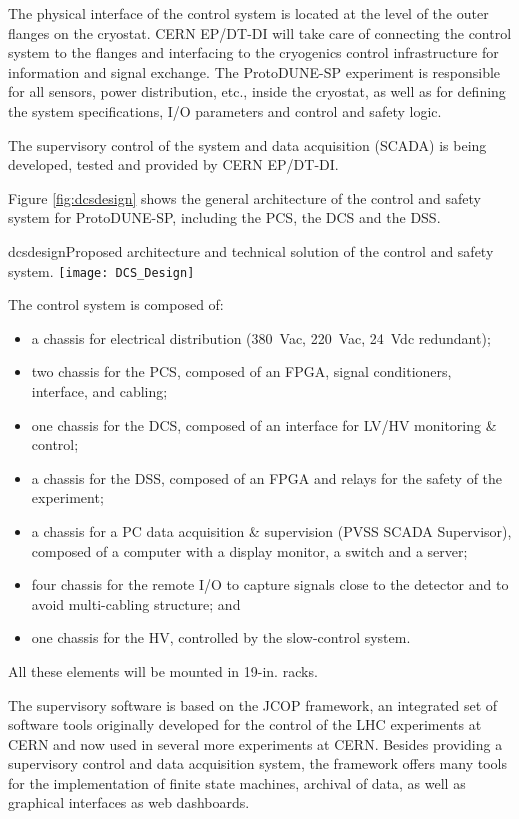 The physical interface of the control system is located at the level of the outer flanges on the cryostat. 
 CERN EP/DT-DI will take care of connecting the control system to the flanges and interfacing to the cryogenics control infrastructure for information and signal exchange. 
The ProtoDUNE-SP experiment is responsible for all sensors, power distribution, etc., inside the cryostat, %
as well as for defining the system specifications, I/O parameters and control and safety logic. 
 
The supervisory control of the system and data acquisition (SCADA) is being developed, tested and provided by CERN EP/DT-DI.	%


Figure \ref{fig:dcsdesign} shows the general architecture of the control and safety system for ProtoDUNE-SP, including the PCS, the DCS and the DSS.

\begin{cdrfigure}{dcsdesign}{Proposed architecture and technical solution of the control and safety system.}
\texttt{[image: DCS\_Design]}
\end{cdrfigure}

The control system is composed of:
\begin{itemize}
\item a chassis for electrical distribution (380~Vac, 220~Vac, 24~Vdc redundant);
\item two chassis for the PCS, composed of an FPGA, signal conditioners, interface, and cabling;
\item  one chassis for the DCS,  composed of an interface for LV/HV monitoring \& control; 
\item a chassis for the DSS, composed of an FPGA and relays for the safety of the experiment; 
\item a chassis for a PC data acquisition \& supervision (PVSS SCADA Supervisor), composed of a computer with a display monitor, a switch and a server; 
\item four chassis for the remote I/O to capture signals close to the detector and to avoid multi-cabling structure; and
\item  one chassis for the HV, controlled by the slow-control system. 
\end{itemize}
All these elements will be mounted in 19-in. racks.

The supervisory software is based on the JCOP framework, an integrated set of software tools originally developed for the control of the LHC experiments at CERN and now used in several more experiments at CERN. Besides providing a supervisory control and data acquisition system, the framework offers many tools for the implementation of finite state machines, archival of data, as well as graphical interfaces as web dashboards.

